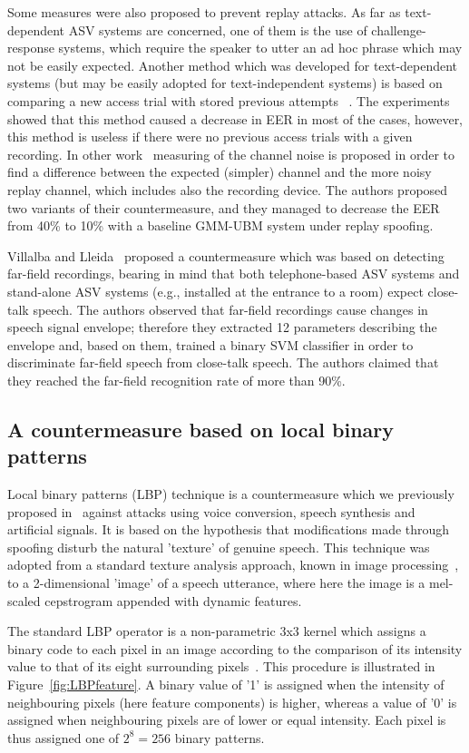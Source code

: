 Some measures were also proposed to prevent replay attacks. As far as text-dependent ASV systems are concerned, one of them is the use of challenge-response systems, which require the speaker to utter an ad hoc phrase which may not be easily expected. Another method which was developed for text-dependent systems (but may be easily adopted for text-independent systems) is based on comparing a new access trial with stored previous attempts ~\cite{Shang2010}. The experiments showed that this method caused a decrease in EER in  most of the cases, however, this method is useless if there were no previous access trials with a given recording. In other work~\cite{Wang2011} measuring of the channel noise is proposed in order to find a difference between the expected (simpler) channel and the more noisy replay channel, which includes also the recording device. The authors proposed two variants of their countermeasure, and they managed to decrease the EER from 40\% to 10\% with a baseline GMM-UBM system under replay spoofing.

Villalba and Lleida~\cite{Villalba2011} proposed a countermeasure which was based on detecting far-field recordings, bearing in mind that both telephone-based ASV systems and stand-alone ASV systems (e.g., installed at the entrance to a room) expect close-talk speech. The authors observed that far-field recordings cause changes in speech signal envelope; therefore they extracted 12 parameters describing the envelope and, based on them, trained a binary SVM classifier in order to discriminate far-field speech from close-talk speech. The authors claimed that they reached the far-field recognition rate of more than 90\%.

\subsection{A countermeasure based on local binary patterns}
Local binary patterns (LBP) technique is a countermeasure which we previously proposed in~\cite{Alegre2013a} against attacks using voice conversion, speech synthesis and artificial signals. It is based on the hypothesis that modifications made through spoofing disturb the natural 'texture' of genuine speech. This technique was adopted from a standard texture analysis approach, known in image processing~\cite{Ojala2002}, to a 2-dimensional 'image' of a speech utterance, where here the image is a mel-scaled cepstrogram appended with dynamic features.

The standard LBP operator is a non-parametric 3x3 kernel which assigns a binary code to each pixel in an image according to the comparison of its intensity value to that of its eight surrounding pixels~\cite{Ojala2002}. This procedure is illustrated in Figure~\ref{fig:LBPfeature}.  A binary value of '1' is assigned when the intensity of neighbouring pixels (here feature components) is higher, whereas a value of '0' is assigned when neighbouring pixels are of lower or equal intensity. Each pixel is thus assigned one of $2^8=256$ binary patterns.

